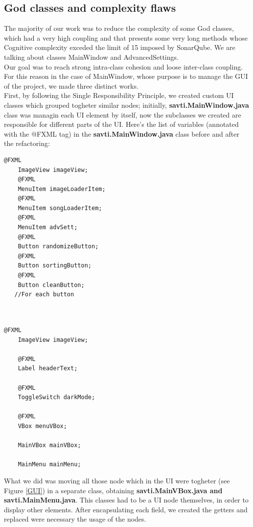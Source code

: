 \documentclass{article}
\begin{document}
\subsection{God classes and complexity flaws}
The majority of our work was to reduce the complexity of some God classes, which had a very high coupling and that presents some very long methods whose Cognitive complexity exceded the limit of 15 imposed by SonarQube.
We are talking about classes MainWindow and AdvancedSettings.\\
Our goal was to reach strong intra-class cohesion and loose inter-class coupling. 
For this reason in the case of MainWindow, whose purpose is to manage the GUI of the project, we made three distinct works.\\
First, by following the Single Responsibility Principle, we created custom UI classes which grouped togheter similar nodes; initially, \textbf{savti.MainWindow.java} class was managin each UI element by itself, now the subclasses we created are responsible for different parts of the UI. Here's the list of variables (annotated with the @FXML tag) in the \textbf{savti.MainWindow.java} class before and after the refactoring: 

\begin{minipage}{0.5 \textwidth}
\begin{lstlisting}[caption = {Variable before refactoring}]
    @FXML
    ImageView imageView;
    @FXML
    MenuItem imageLoaderItem;
    @FXML
    MenuItem songLoaderItem;
    @FXML
    MenuItem advSett;
    @FXML
    Button randomizeButton;
    @FXML
    Button sortingButton;
    @FXML
    Button cleanButton;
   //For each button
    
    
\end{lstlisting}
\end{minipage}
\begin{minipage}{0.5 \textwidth}
\begin{lstlisting}[caption = {Variables after refactoring}]
    @FXML
    ImageView imageView;
    
    @FXML
    Label headerText;
    
    @FXML
    ToggleSwitch darkMode;
    
    @FXML
    VBox menuVBox;
    
    MainVBox mainVBox;
    
    MainMenu mainMenu;
\end{lstlisting}  
\end{minipage}
\newpage
What we did was moving all those node which in the UI were togheter (see Figure \ref{GUI}) in a separate class, obtaining \textbf{savti.MainVBox.java and savti.MainMenu.java}. This classes had to be a UI node themselves, in order to display other elements. After encapsulating each field, we created the getters and replaced were necessary the usage of the nodes.
\end{document}

